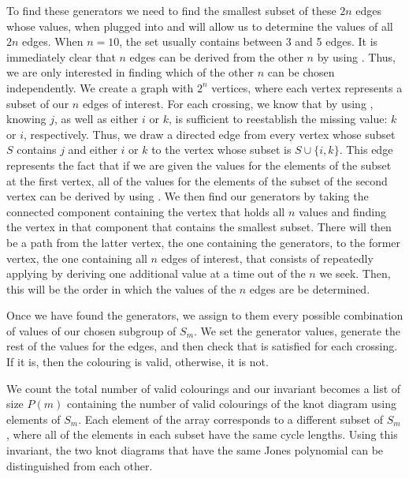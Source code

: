 \begin{paper}
To find these generators we need to find the smallest subset of these $2n$ edges
whose values, when plugged into \eqUpper and \eqLower will allow us to determine
the values of all $2n$ edges.
When $n=10$, the set usually contains between 3 and 5 edges.
It is immediately clear that $n$ edges can be derived from the other $n$ by
using \eqUpper.
Thus, we are only interested in finding which of the other $n$ can be
chosen independently.
We create a graph with $2^n$ vertices, where each vertex represents a subset of
our $n$ edges of interest.
For each crossing, we know that by using \eqBoth, knowing $j$, as well as either
$i$ or $k$, is sufficient to reestablish the missing value: $k$ or $i$,
respectively.
Thus, we draw a directed edge from every vertex whose subset $S$ contains $j$
and either $i$ or $k$ to the vertex whose subset is $S\cup\{i,k\}$.
This edge represents the fact that if we are given the values for the elements
of the subset at the first vertex, all of the values for the elements of the
subset of the second vertex can be derived by using \eqBoth.
We then find our generators by taking the connected component containing the
vertex that holds all $n$ values and finding the vertex in that component that
contains the smallest subset.
There will then be a path from the latter vertex, the one containing the
generators, to the former vertex, the one containing all $n$ edges of interest,
that consists of repeatedly applying \eqBoth by deriving one additional value at
a time out of the $n$ we seek.
Then, this will be the order in which the values of the $n$ edges are be
determined.


Once we have found the generators, we assign to them every possible
combination of values of our chosen subgroup of $S_m$.
We set the generator values, generate the rest of the values for the edges,
and then check that \eqBoth is satisfied for each crossing.
If it is, then the colouring is valid, otherwise, it is not.


We count the total number of valid colourings and our invariant becomes a list
of size $P(m)$ containing the number of valid colourings of the knot diagram
using elements of $S_m$.
Each element of the array corresponds to a different subset of $S_m$, where all
of the elements in each subset have the same cycle lengths.
Using this invariant, the two knot diagrams that have the same Jones polynomial
can be distinguished from each other.


\end{paper}
